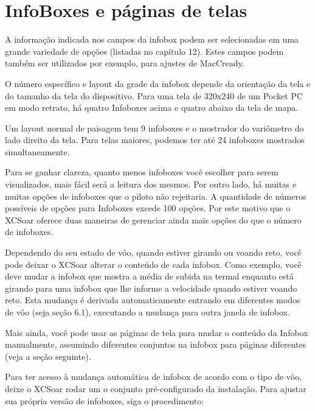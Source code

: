 \section{InfoBoxes e páginas de telas}\label{sec:infoboxandpages}

A informação indicada nos campos da infobox podem ser selecionadas em uma grande variedade de opções (listadas no capítulo 12).  Estes campos podem também ser utilizados por exemplo, para ajustes de MacCready.

O número específico e layout da grade da infobox depende da orientação da tela e do tamanho da tela do dispositivo.
Para uma tela de 320x240 de um Pocket PC em modo retrato, há quatro Infoboxes acima e quatro abaixo da tela de mapa.

Um layout normal de paisagem tem 9 infoboxes e o mostrador do variômetro do lado direito da tela.  Para telas maiores, podemos ter até 24 infoboxes mostrados simultaneamente.

Para se ganhar clareza, quanto menos infoboxes você escolher para serem visualizados, mais fácil será a leitura dos mesmos.  Por outro lado, há muitas e muitas opções de infoboxes que o piloto não rejeitaria.  A quantidade de números possíveis de opções para Infoboxes excede 100 opções.  Por este motivo que o XCSoar oferece duas maneiras de gerenciar ainda mais opções do que o número de infoboxes.

Dependendo do seu estado de vôo, quando estiver girando ou voando reto, você pode deixar o XCSoar alterar o conteúdo de cada infobox.  Como exemplo, você deve mudar a infobox que mostra a média de subida na termal enquanto está girando para uma infobox que lhe informe a velocidade quando estiver voando reto.  Esta mudança é derivada automaticamente entrando em diferentes modos de vôo (seja seção 6.1), executando a mudança para outra janela de infobox.

Mais ainda, você pode usar as páginas de tela para mudar o conteúdo da Infobox manualmente, assumindo diferentes conjuntos na infobox para páginas diferentes (veja a seção seguinte).

Para ter acesso à mudança automática de infobox de acordo com o tipo de vôo, deixe o XCSoar rodar um o conjunto pré-configurado da instalação.  Para ajustar sua própria versão de infoboxes, siga o procedimento:

